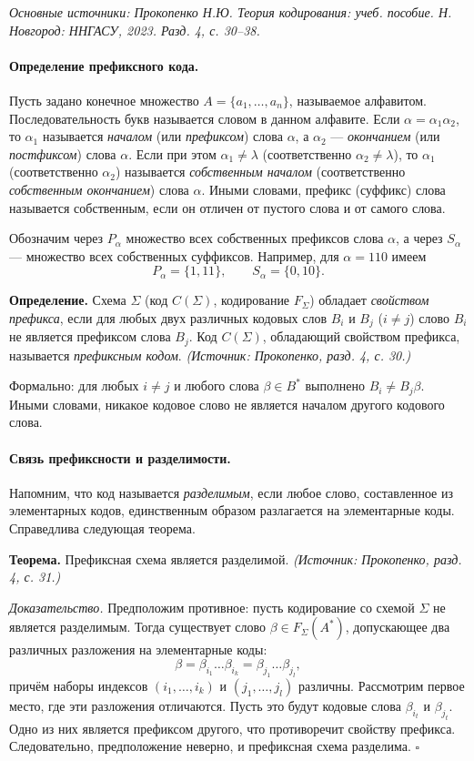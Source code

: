 \documentclass[a4paper,12pt]{article}
\begin{document}
\noindent\textit{Основные источники: Прокопенко Н.Ю. Теория кодирования: учеб. пособие. Н. Новгород: ННГАСУ, 2023. Разд. 4, с. 30--38.}

\paragraph{Определение префиксного кода.}
Пусть задано конечное множество \(A=\{a_1,\dots,a_n\}\), называемое алфавитом. Последовательность букв называется словом в данном алфавите. Если \(\alpha=\alpha_1\alpha_2\), то \(\alpha_1\) называется \emph{началом} (или \emph{префиксом}) слова \(\alpha\), а \(\alpha_2\) — \emph{окончанием} (или \emph{постфиксом}) слова \(\alpha\). Если при этом \(\alpha_1\ne\lambda\) (соответственно \(\alpha_2\ne\lambda\)), то \(\alpha_1\) (соответственно \(\alpha_2\)) называется \emph{собственным началом} (соответственно \emph{собственным окончанием}) слова \(\alpha\). Иными словами, префикс (суффикс) слова называется собственным, если он отличен от пустого слова и от самого слова.

Обозначим через \(P_\alpha\) множество всех собственных префиксов слова \(\alpha\), а через \(S_\alpha\) — множество всех собственных суффиксов. Например, для \(\alpha=110\) имеем
\[
P_\alpha=\{1,11\},\qquad S_\alpha=\{0,10\}.
\]

\textbf{Определение.} Схема \(\Sigma\) (код \(C(\Sigma)\), кодирование \(F_\Sigma\)) обладает \emph{свойством префикса}, если для любых двух различных кодовых слов \(B_i\) и \(B_j\) (\(i\ne j\)) слово \(B_i\) не является префиксом слова \(B_j\). Код \(C(\Sigma)\), обладающий свойством префикса, называется \emph{префиксным кодом}.
\textit{(Источник: Прокопенко, разд. 4, с. 30.)}

Формально: для любых \(i\ne j\) и любого слова \(\beta\in B^*\) выполнено \(B_i\ne B_j\beta\). Иными словами, никакое кодовое слово не является началом другого кодового слова.

\paragraph{Связь префиксности и разделимости.}
Напомним, что код называется \emph{разделимым}, если любое слово, составленное из элементарных кодов, единственным образом разлагается на элементарные коды. Справедлива следующая теорема.

\textbf{Теорема.} Префиксная схема является разделимой.
\textit{(Источник: Прокопенко, разд. 4, с. 31.)}

\emph{Доказательство.} Предположим противное: пусть кодирование со схемой \(\Sigma\) не является разделимым. Тогда существует слово \(\beta\in F_\Sigma(A^*)\), допускающее два различных разложения на элементарные коды:
\[
\beta=\beta_{i_1}\dots\beta_{i_k}=\beta_{j_1}\dots\beta_{j_l},
\]
причём наборы индексов \((i_1,\dots,i_k)\) и \((j_1,\dots,j_l)\) различны. Рассмотрим первое место, где эти разложения отличаются. Пусть это будут кодовые слова \(\beta_{i_t}\) и \(\beta_{j_t}\). Одно из них является префиксом другого, что противоречит свойству префикса. Следовательно, предположение неверно, и префиксная схема разделима. \(\square\)
\end{document}
